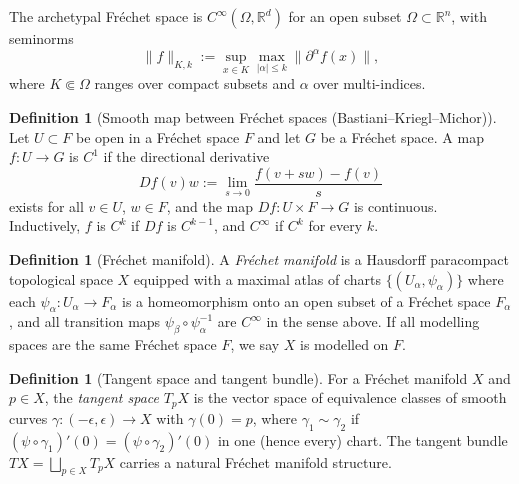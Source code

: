 \documentclass[11pt]{article}
\theoremstyle{definition}
\newtheorem{definition}[theorem]{Definition}
\theoremstyle{remark}
\newcommand{\R}{\mathbb{R}}
\begin{document}
The archetypal Fr\'echet space is $C^\infty(\Omega,\R^d)$ for an open subset
$\Omega\subset\R^n$, with seminorms
\[
\|f\|_{K,k}:=\sup_{x\in K}\max_{|\alpha|\le k}\|\partial^\alpha f(x)\|,
\]
where $K\Subset\Omega$ ranges over compact subsets and $\alpha$ over
multi-indices.

\begin{definition}[Smooth map between Fr\'echet spaces (Bastiani--Kriegl--Michor)]
Let $U\subset F$ be open in a Fr\'echet space $F$ and let $G$ be a Fr\'echet
space.  A map $f:U\to G$ is \emph{$C^1$} if the directional derivative
\[
Df(v)w:=\lim_{s\to 0}\frac{f(v+sw)-f(v)}{s}
\]
exists for all $v\in U$, $w\in F$, and the map $Df:U\times F\to G$ is
continuous.  Inductively, $f$ is $C^k$ if $Df$ is $C^{k-1}$, and $C^\infty$
if $C^k$ for every $k$.
\end{definition}

\begin{definition}[Fr\'echet manifold]
A \emph{Fr\'echet manifold} is a Hausdorff paracompact topological space $X$
equipped with a maximal atlas of charts $\{(U_\alpha,\psi_\alpha)\}$ where
each $\psi_\alpha:U_\alpha\to F_\alpha$ is a homeomorphism onto an open
subset of a Fr\'echet space $F_\alpha$, and all transition maps
$\psi_\beta\circ\psi_\alpha^{-1}$ are $C^\infty$ in the sense above.  If all
modelling spaces are the same Fr\'echet space $F$, we say $X$ is modelled on
$F$.
\end{definition}

\begin{definition}[Tangent space and tangent bundle]
For a Fr\'echet manifold $X$ and $p\in X$, the \emph{tangent space} $T_pX$ is
the vector space of equivalence classes of smooth curves $\gamma:(-\epsilon,
\epsilon)\to X$ with $\gamma(0)=p$, where $\gamma_1\sim\gamma_2$ if
$(\psi\circ\gamma_1)'(0)=(\psi\circ\gamma_2)'(0)$ in one (hence every) chart.
The tangent bundle $TX=\bigsqcup_{p\in X}T_pX$ carries a natural Fr\'echet
manifold structure.
\end{definition}
\end{document}
